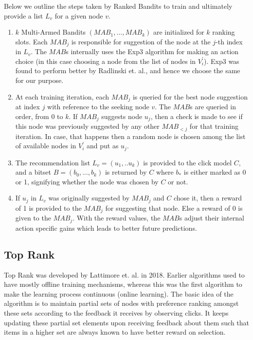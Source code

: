 Below we outline the steps taken by Ranked Bandits to train and ultimately provide a list $L_{v}$ for a given node $v$. 

\begin{enumerate}
	\item $k$ Multi-Armed Bandits $(MAB_{1},...,MAB_{k})$ are initialized for $k$ ranking slots. Each $MAB_{j}$ is responsible for suggestion of the node at the $j$-th index in $L_{v}$. The $MAB$s internally uses the Exp3 algorithm \cite{auer2002nonstochastic} for making an action choice (in this case choosing a node from the list of nodes in $V^{\prime}_{i}$). Exp3 was found to perform better by Radlinski et. al., and hence we choose the same for our purpose.
	
	\item At each training iteration, each $MAB_{j}$ is queried for the best node suggestion at index $j$ with reference to the seeking node $v$. The $MAB$s are queried in order, from $0$ to $k$. If $MAB_{j}$ suggests node $u_{j}$, then a check is made to see if this node was previously suggested by any other $MAB_{<j}$ for that training iteration. In case, that happens then a random node is chosen among the list of available nodes in $V^{\prime}_{i}$ and put as $u_{j}$.
	
	\item The recommendation list $L_{v}=(u_{1},..u_{k})$ is provided to the click model $C$, and a bitset $B=(b_{0},...,b_{k})$ is returned by $C$ where $b_{*}$ is either marked as 0 or 1, signifying whether the node was chosen by $C$ or not.
	
	\item If $u_{j}$ in $L_{v}$ was originally suggested by $MAB_{j}$ and $C$ chose it, then a reward of 1 is provided to the $MAB_{j}$ for suggesting that node. Else a reward of 0 is given to the $MAB_{j}$. With the reward values, the $MAB$s adjust their internal action specific gains which leads to better future predictions.
\end{enumerate}

\subsection{Top Rank}

Top Rank \cite{lattimore2018toprank} was developed by Lattimore et. al. in 2018. Earlier algorithms used to have mostly offline training mechanisms, whereas this was the first algorithm to make the learning process continuous (online learning). The basic idea of the algorithm is to maintain partial sets of nodes with preference ranking amongst these sets according to the feedback it receives by observing clicks. It keeps updating these partial set elements upon receiving feedback about them such that items in a higher set are always known to have better reward on selection. 

